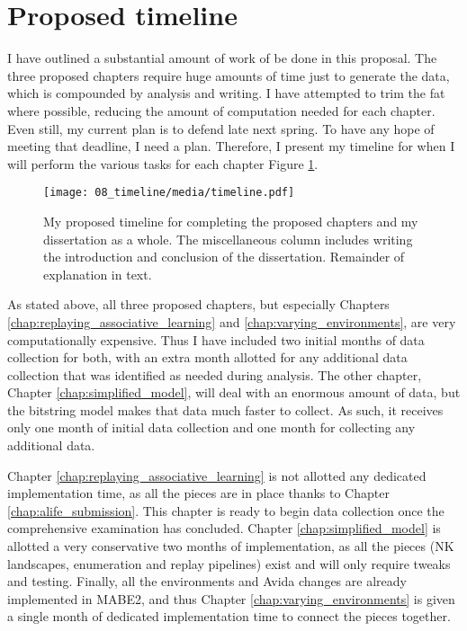 \section{Proposed timeline}

I have outlined a substantial amount of work of be done in this proposal. %
The three proposed chapters require huge amounts of time just to generate the data, which is compounded by analysis and writing. 
I have attempted to trim the fat where possible, reducing the amount of computation needed for each chapter. 
Even still, my current plan is to defend late next spring.
To have any hope of meeting that deadline, I need a plan. 
Therefore, I present my timeline for when I will perform the various tasks for each chapter Figure \ref{fig:timeline}. %

\begin{figure}[h!]
    \centering
    \texttt{[image: 08\_timeline/media/timeline.pdf]}
    \caption{My proposed timeline for completing the proposed chapters and my dissertation as a whole. 
    The miscellaneous column includes writing the introduction and conclusion of the dissertation.
    Remainder of explanation in text.}
    \label{fig:timeline}
\end{figure}


As stated above, all three proposed chapters, but especially Chapters \ref{chap:replaying_associative_learning} and \ref{chap:varying_environments}, are very computationally expensive. Thus I have included two initial months of data collection for both, with an extra month allotted for any additional data collection that was identified as needed during analysis. 
The other chapter, Chapter \ref{chap:simplified_model}, will deal with an enormous amount of data, but the bitstring model makes that data much faster to collect. 
As such, it receives only one month of initial data collection and one month for collecting any additional data. 

Chapter \ref{chap:replaying_associative_learning} is not allotted any dedicated implementation time, as all the pieces are in place thanks to Chapter \ref{chap:alife_submission}.
This chapter is ready to begin data collection once the comprehensive examination has concluded.
Chapter \ref{chap:simplified_model} is allotted a very conservative two months of implementation, as all the pieces (NK landscapes, enumeration and replay pipelines) exist and will only require tweaks and testing. 
Finally, all the environments and Avida changes are already implemented in MABE2, and thus Chapter \ref{chap:varying_environments} is given a single month of dedicated implementation time to connect the pieces together. 

